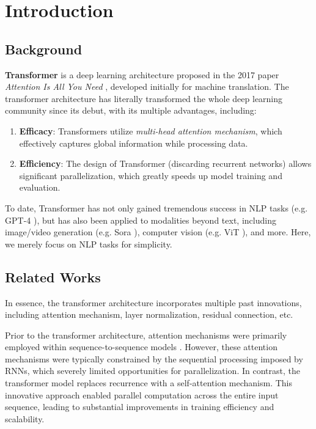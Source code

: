 \chapter{Introduction}

\section{Background}

\textbf{Transformer} is a deep learning architecture proposed in the 2017 paper \textit{Attention Is All You Need} \cite{vaswani2017attention}, developed initially for machine translation. The transformer architecture has literally transformed the whole deep learning community since its debut, with its multiple advantages, including:

\begin{enumerate}
    \item \textbf{Efficacy}: Transformers utilize \textit{multi-head attention mechanism}, which effectively captures global information while processing data.
    \item \textbf{Efficiency}: The design of Transformer (discarding recurrent networks) allows significant parallelization, which greatly speeds up model training and evaluation.
\end{enumerate}

To date, Transformer has not only gained tremendous success in NLP tasks (e.g. GPT-4 \cite{achiam2023gpt}), but has also been applied to modalities beyond text, including image/video generation (e.g. Sora \cite{videoworldsimulators2024}), computer vision (e.g. ViT \cite{dosovitskiy2020image}), and more. Here, we merely focus on NLP tasks for simplicity.

\section{Related Works}

In essence, the transformer architecture incorporates multiple past innovations, including attention mechanism, layer normalization, residual connection, etc.

Prior to the transformer architecture, attention mechanisms were primarily employed within sequence-to-sequence models \cite{bahdanau2014neural}. However, these attention mechanisms were typically constrained by the sequential processing imposed by RNNs, which severely limited opportunities for parallelization. In contrast, the transformer model \cite{vaswani2017attention} replaces recurrence with a self-attention mechanism. This innovative approach enabled parallel computation across the entire input sequence, leading to substantial improvements in training efficiency and scalability. 

